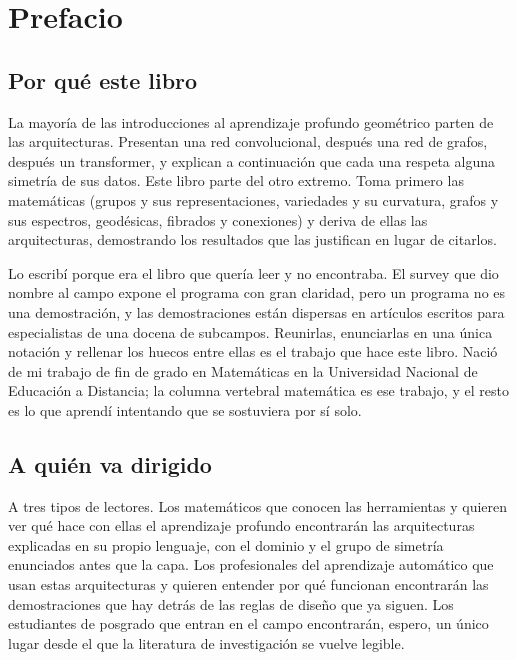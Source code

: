 \chapter*{Prefacio}

\section*{Por qué este libro}

La mayoría de las introducciones al aprendizaje profundo geométrico parten de las arquitecturas. Presentan una red convolucional, después una red de grafos, después un transformer, y explican a continuación que cada una respeta alguna simetría de sus datos. Este libro parte del otro extremo. Toma primero las matemáticas (grupos y sus representaciones, variedades y su curvatura, grafos y sus espectros, geodésicas, fibrados y conexiones) y deriva de ellas las arquitecturas, demostrando los resultados que las justifican en lugar de citarlos.

Lo escribí porque era el libro que quería leer y no encontraba. El survey que dio nombre al campo \citep{DBLP:journals/corr/abs-2104-13478} expone el programa con gran claridad, pero un programa no es una demostración, y las demostraciones están dispersas en artículos escritos para especialistas de una docena de subcampos. Reunirlas, enunciarlas en una única notación y rellenar los huecos entre ellas es el trabajo que hace este libro. Nació de mi trabajo de fin de grado en Matemáticas en la Universidad Nacional de Educación a Distancia; la columna vertebral matemática es ese trabajo, y el resto es lo que aprendí intentando que se sostuviera por sí solo.

\section*{A quién va dirigido}

A tres tipos de lectores. Los matemáticos que conocen las herramientas y quieren ver qué hace con ellas el aprendizaje profundo encontrarán las arquitecturas explicadas en su propio lenguaje, con el dominio y el grupo de simetría enunciados antes que la capa. Los profesionales del aprendizaje automático que usan estas arquitecturas y quieren entender por qué funcionan encontrarán las demostraciones que hay detrás de las reglas de diseño que ya siguen. Los estudiantes de posgrado que entran en el campo encontrarán, espero, un único lugar desde el que la literatura de investigación se vuelve legible.

